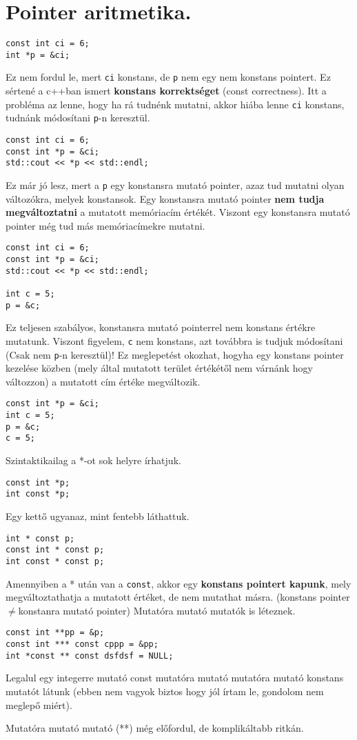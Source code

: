 \documentclass[a4paper,11.5pt]{article}
\begin{document}
	\section{Pointer aritmetika.}
		\begin{lstlisting}
const int ci = 6;
int *p = &ci;
		\end{lstlisting}
		Ez nem fordul le, mert \texttt{ci} konstans, de \texttt{p} nem egy nem konstans pointert. Ez sértené a c++ban ismert \textbf{konstans korrektséget} (const correctness). Itt a probléma az lenne, hogy ha rá tudnénk mutatni, akkor hiába lenne \texttt{ci} konstans, tudnánk módosítani \texttt{p}-n keresztül.
		\begin{lstlisting}
const int ci = 6;
const int *p = &ci;
std::cout << *p << std::endl;
		\end{lstlisting}
		Ez már jó lesz, mert a \texttt{p} egy konstansra mutató pointer, azaz tud mutatni olyan változókra, melyek konstansok. Egy konstansra mutató pointer \textbf{nem tudja megváltoztatni} a mutatott memóriacím értékét. Viszont egy konstansra mutató pointer még tud más memóriacímekre mutatni.
		\begin{lstlisting}
const int ci = 6;
const int *p = &ci;
std::cout << *p << std::endl;

int c = 5;
p = &c;
		\end{lstlisting}
		Ez teljesen szabályos, konstansra mutató pointerrel nem konstans értékre mutatunk. Viszont figyelem, \texttt{c} nem konstans, azt továbbra is tudjuk módosítani (Csak nem \texttt{p}-n keresztül)! Ez meglepetést okozhat, hogyha egy konstans pointer kezelése közben (mely által mutatott terület értékétől nem várnánk hogy változzon) a mutatott cím értéke megváltozik.
		\begin{lstlisting}
const int *p = &ci;
int c = 5;
p = &c;
c = 5;
		\end{lstlisting}
		Szintaktikailag a *-ot sok helyre írhatjuk.
		\begin{lstlisting}
const int *p;
int const *p;
		\end{lstlisting}
		Egy kettő ugyanaz, mint fentebb láthattuk.
		\begin{lstlisting}
int * const p;
const int * const p;
int const * const p;
		\end{lstlisting} 
		Amennyiben a * után van a \texttt{const}, akkor egy \textbf{konstans pointert kapunk}, mely megváltoztathatja a mutatott értéket, de nem mutathat másra. (konstans pointer \quad $\not=$\quad konstanra mutató pointer)
		Mutatóra mutató mutatók is léteznek.
		\begin{lstlisting}
const int **pp = &p;
const int *** const cppp = &pp;
int *const ** const dsfdsf = NULL;
		\end{lstlisting}
		Legalul egy integerre mutató const mutatóra mutató mutatóra mutató konstans mutatót látunk (ebben nem vagyok biztos hogy jól írtam le, gondolom nem meglepő miért).
	\begin{note}
		Mutatóra mutató mutató (**) még előfordul, de komplikáltabb ritkán.
	\end{note}
\end{document}
